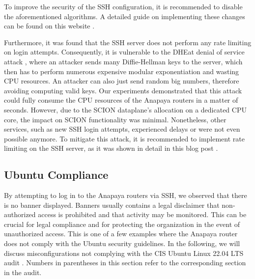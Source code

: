 To improve the security of the SSH configuration, it is recommended to disable the aforementioned algorithms.
A detailed guide on implementing these changes can be found on this website \cite{sshauditHardeningGuides}.


Furthermore, it was found that the SSH server does not perform any rate limiting on login attempts.
Consequently, it is vulnerable to the DHEat denial of service attack \cite{dheatAttack}, where an attacker sends many Diffie-Hellman keys to the server, which then has to perform numerous expensive modular exponentiation and wasting CPU resources.
An attacker can also just send random big numbers, therefore avoiding computing valid keys.
Our experiments demonstrated that this attack could fully consume the CPU resources of the Anapaya routers in a matter of seconds.
However, due to the SCION dataplane's allocation on a dedicated CPU core, the impact on SCION functionality was minimal.
Nonetheless, other services, such as new SSH login attempts, experienced delays or were not even possible anymore.
To mitigate this attack, it is recommended to implement rate limiting on the SSH server, as it was shown in detail in this blog post \cite{dheatAnalysis}.


\subsection{Ubuntu Compliance}
\label{sec:ubuntu-compliance}
By attempting to log in to the Anapaya routers via SSH, we observed that there is no banner displayed.
Banners usually contains a legal disclaimer that non-authorized access is prohibited and that activity may be monitored.
This can be crucial for legal compliance and for protecting the organization in the event of unauthorized access.
This is one of a few examples where the Anapaya router does not comply with the Ubuntu security guidelines.
In the following, we will discuss misconfigurations not complying with the CIS Ubuntu Linux 22.04 LTS audit \cite{cisUbuntuLinux2204LTS}.
Numbers in parentheses in this section refer to the corresponding section in the audit.

